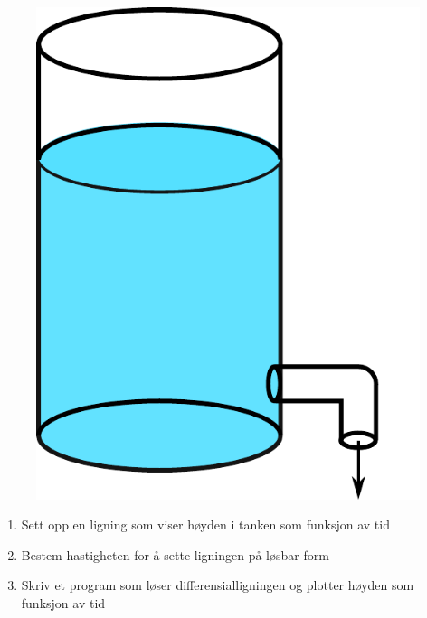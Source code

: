 \begin{figure}[h!]
    \centering
    \includegraphics[scale=0.7]{Figures/tank.pdf}
    \caption{}
    \label{fig:tank}
\end{figure}

\begin{enumerate}
    \item Sett opp en ligning som viser høyden i tanken som funksjon av tid
    \item Bestem hastigheten for å sette ligningen på løsbar form
    \item Skriv et program som løser differensialligningen og plotter høyden som funksjon av tid
\end{enumerate}

